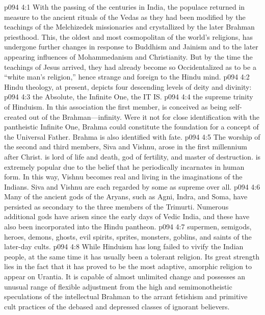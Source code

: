 %
\vs p094 4:1 With the passing of the centuries in India, the populace returned in measure to the ancient rituals of the Vedas as they had been modified by the teachings of the Melchizedek missionaries and crystallized by the later Brahman priesthood. This, the oldest and most cosmopolitan of the world’s religions, has undergone further changes in response to Buddhism and Jainism and to the later appearing influences of Mohammedanism and Christianity. But by the time the teachings of Jesus arrived, they had already become so Occidentalized as to be a “white man’s religion,” hence strange and foreign to the Hindu mind.
\pc \vs p094 4:2 Hindu theology, at present, depicts four descending levels of deity and divinity:
\pc \vs p094 4:3 \bibnobreakspace {} the Absolute, the Infinite One, the IT IS.
\pc \vs p094 4:4 \bibnobreakspace {} the supreme trinity of Hinduism. In this association  the first member, is conceived as being self\hyp{}created out of the Brahman---infinity. Were it not for close identification with the pantheistic Infinite One, Brahma could constitute the foundation for a concept of the Universal Father. Brahma is also identified with fate.\plusone
\vs p094 4:5 The worship of the second and third members, Siva and Vishnu, arose in the first millennium after Christ.  is lord of life and death, god of fertility, and master of destruction.  is extremely popular due to the belief that he periodically incarnates in human form. In this way, Vishnu becomes real and living in the imaginations of the Indians. Siva and Vishnu are each regarded by some as supreme over all.
\pc \vs p094 4:6 \bibnobreakspace {} Many of the ancient gods of the Aryans, such as Agni, Indra, and Soma, have persisted as secondary to the three members of the Trimurti. Numerous additional gods have arisen since the early days of Vedic India, and these have also been incorporated into the Hindu pantheon.
\pc \vs p094 4:7 \bibnobreakspace {} supermen, semigods, heroes, demons, ghosts, evil spirits, sprites, monsters, goblins, and saints of the later\hyp{}day cults.
\pc \vs p094 4:8 While Hinduism has long failed to vivify the Indian people, at the same time it has usually been a tolerant religion. Its great strength lies in the fact that it has proved to be the most adaptive, amorphic religion to appear on Urantia. It is capable of almost unlimited change and possesses an unusual range of flexible adjustment from the high and semimonotheistic speculations of the intellectual Brahman to the arrant fetishism and primitive cult practices of the debased and depressed classes of ignorant believers.

